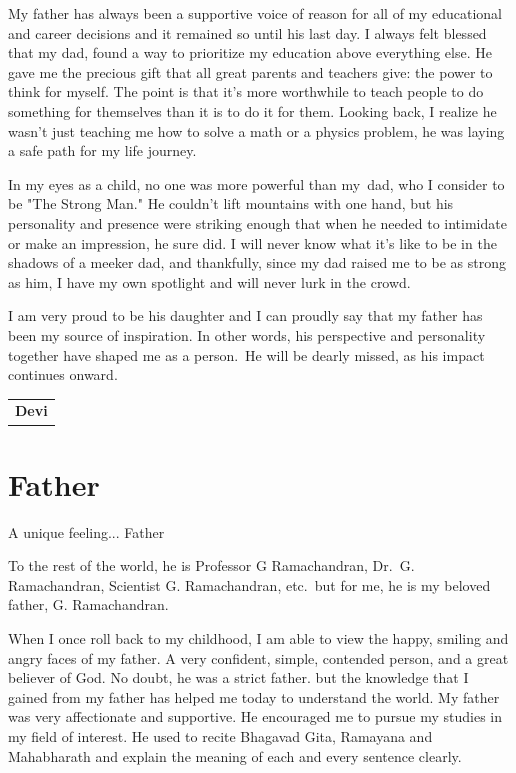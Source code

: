 My father has always been a supportive voice of reason for all of my educational and career decisions and it remained so until his last day. I always felt blessed that my dad, found a way to prioritize my education above everything else. He gave me the precious gift that all great parents and teachers give: the power to think for myself. The point is that it's more worthwhile to teach people to do something for themselves than it is to do it for them. Looking back, I realize he wasn't just teaching me how to solve a math or a physics problem, he was laying a safe path for my life journey.

In my eyes as a child, no one was more powerful than my dad, who I consider to be "The Strong Man." He couldn't lift mountains with one hand, but his personality and presence were striking enough that when he needed to intimidate or make an impression, he sure did. I will never know what it's like to be in the shadows of a meeker dad, and thankfully, since my dad raised me to be as strong as him, I have my own spotlight and will never lurk in the crowd. 

I am very proud to be his daughter and I can proudly say that my father has been my source of inspiration. In other words, his perspective and personality together have shaped me as a person. He will be dearly missed, as his impact continues onward.
\bigskip

\begin{flushright}
\begin{tabular}{c}
\textbf{Devi}
\end{tabular}
\end{flushright}
\bigskip

\section*{Father}

A unique feeling... Father

To the rest of the world, he is Professor G Ramachandran, Dr.\ G. Ramachandran, Scientist  G. Ramachandran, etc.\ but for me, he is my beloved father, G. Ramachandran. 

When I once roll back to my childhood, I am able to view the happy, smiling and angry faces of my father. A very confident, simple, contended person, and a great believer of God. No doubt, he was a strict father. but the knowledge that I gained from my father has helped me today to understand the world. My father was very affectionate and supportive. He encouraged me to pursue my studies in my field of interest. He used to recite Bhagavad Gita, Ramayana and Mahabharath and explain the meaning of each and every sentence clearly. 

